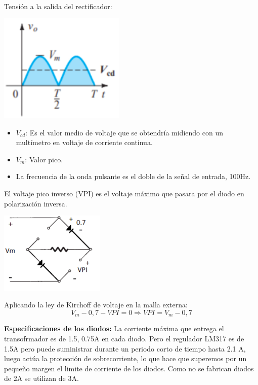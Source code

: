 \paragraph{} Tensión a la salida del rectificador:

\begin{center}
    \includegraphics[width=6cm]{./imagenes/puentesal.png}
\end{center}

\begin{itemize}
    \item $V_{cd}$: Es el valor medio de voltaje que se obtendría midiendo con un multímetro en voltaje de corriente continua.
    \item $V_{m}$: Valor pico.
    \item La frecuencia de la onda pulsante es el doble de la señal de entrada, 100Hz.
\end{itemize}

\saltoPag{}

\sangria{} El voltaje pico inverso (VPI) es el voltaje máximo que pasara por el diodo en polarización inversa. 

\begin{center}
\includegraphics[width=5cm]{./imagenes/VPI.png}
\end{center}

\sangria{} Aplicando la ley de Kirchoff de voltaje en la malla externa:
\begin{equation*}
    V_m - 0,7 - VPI = 0 \Rightarrow VPI = V_m - 0,7
\end{equation*}

\sangria{} \textbf{Especificaciones de los diodos:} 
\sangria{} La corriente máxima que entrega el transofrmador es de 1.5, 0.75A en cada diodo. Pero el regulador LM317 es de 1.5A pero puede suministrar durante un
periodo corto de tiempo hasta 2.1 A, luego actúa la protección de sobrecorriente, lo que hace que superemos por un pequeño margen el limite de corriente de los diodos.
Como no se fabrican diodos de 2A se utilizan de 3A.

